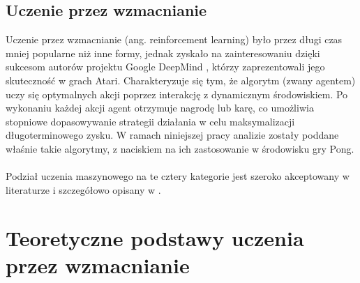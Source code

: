 \documentclass[a4paper, 12pt]{article}
\numberwithin{equation}{section}
\begin{document}
    \subsection{Uczenie przez wzmacnianie}
    Uczenie przez wzmacnianie (ang. reinforcement learning) \cite{sutton2018rl} było przez długi czas mniej popularne niż inne formy, jednak zyskało na zainteresowaniu dzięki sukcesom autorów projektu Google DeepMind \cite{mnih2015nature}, którzy zaprezentowali jego skuteczność w grach Atari. Charakteryzuje się tym, że algorytm (zwany agentem) uczy się optymalnych akcji poprzez interakcję z dynamicznym środowiskiem. Po wykonaniu każdej akcji agent otrzymuje nagrodę lub karę, co umożliwia stopniowe dopasowywanie strategii działania w celu maksymalizacji długoterminowego zysku. W ramach niniejszej pracy analizie zostały poddane właśnie takie algorytmy, z naciskiem na ich zastosowanie w środowisku gry Pong.
    \\ \\ 
    Podział uczenia maszynowego na te cztery kategorie jest szeroko akceptowany w literaturze i szczegółowo opisany w \cite{chollet2021deep}.

    
    \section{Teoretyczne podstawy uczenia przez wzmacnianie}
\end{document}
